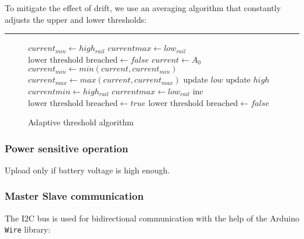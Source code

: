 To mitigate the effect of drift, we use an averaging algorithm that constantly adjusts the upper and lower thresholds:


\par\noindent\rule{\textwidth}{0.4pt}

\begin{figure}[h]
    \centering


    \begin{algorithmic}
        \State $current_{min} \gets high_{rail}$
        \State $current{max} \gets low_{rail}$
        \State $\text{lower threshold breached} \gets false$
        \Loop
        \State $current \gets A_0$
        \State $current_{min} \gets min(current, current_{min})$
        \State $current_{max} \gets max(current, current_{max})$
        \State update $low$
        \State update $high$
        \State $current{min} \gets high_{rail}$
        \State $current{max} \gets low_{rail}$
        \EndIf
        \State inc
        \State $\text{lower threshold breached} \gets true$
        \State $\text{lower threshold breached} \gets false$
        \EndIf
        \EndLoop

    \end{algorithmic}
    \caption{Adaptive threshold algorithm}
\end{figure}

\subsubsection{Power sensitive operation}

Upload only if battery voltage is high enough.

\subsubsection{Master Slave communication}

The I2C bus is used for bidirectional communication with the help of the Arduino \texttt{Wire} library:

